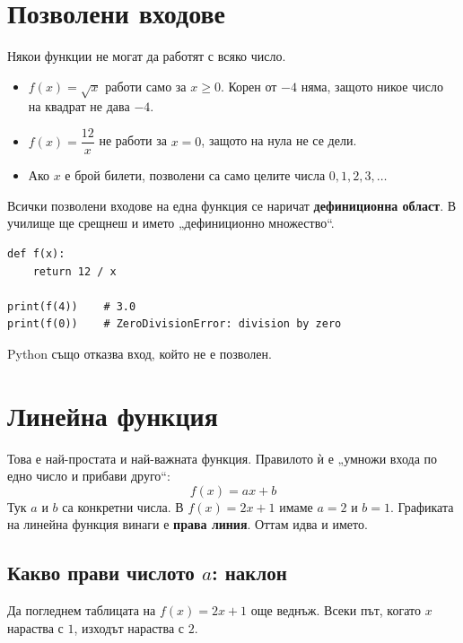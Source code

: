 \documentclass[11pt,a4paper]{article}
\begin{document}
\section{Позволени входове}

Някои функции не могат да работят с всяко число.

\begin{itemize}
  \item $f(x)=\sqrt{x}$ работи само за $x\ge 0$. Корен от $-4$ няма, защото никое число на квадрат не дава $-4$.
  \item $f(x)=\dfrac{12}{x}$ не работи за $x=0$, защото на нула не се дели.
  \item Ако $x$ е брой билети, позволени са само целите числа $0, 1, 2, 3, \dots$
\end{itemize}

Всички позволени входове на една функция се наричат \textbf{дефиниционна област}. В училище ще срещнеш и името „дефиниционно множество“.

\begin{pybox}
\begin{Verbatim}
def f(x):
    return 12 / x

print(f(4))    # 3.0
print(f(0))    # ZeroDivisionError: division by zero
\end{Verbatim}
Python също отказва вход, който не е позволен.
\end{pybox}
\section{Линейна функция}

Това е най-простата и най-важната функция. Правилото ѝ е „умножи входа по едно число и прибави друго“:
\[ f(x) = ax + b \]
Тук $a$ и $b$ са конкретни числа. В $f(x)=2x+1$ имаме $a=2$ и $b=1$.
Графиката на линейна функция винаги е \textbf{права линия}. Оттам идва и името.

\subsection{Какво прави числото \texorpdfstring{$a$}{a}: наклон}

Да погледнем таблицата на $f(x)=2x+1$ още веднъж. Всеки път, когато $x$ нараства с $1$, изходът нараства с $2$.
\end{document}
